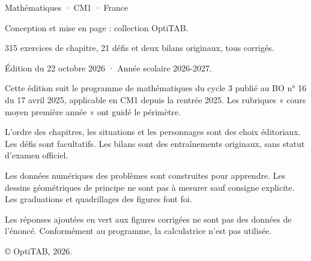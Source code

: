 \thispagestyle{empty}\vspace*{\fill}
\begin{minipage}{128mm}\fontsize{9}{13}\selectfont\color{otMuted}
{\otSemi\color{otInk}Mathématiques · CM1 · France}\par\medskip
Conception et mise en page : collection OptiTAB.\par
315 exercices de chapitre, 21 défis et deux bilans originaux, tous corrigés.\par
Édition du 22 octobre 2026 · Année scolaire 2026-2027.\par\bigskip
Cette édition suit le programme de mathématiques du cycle 3 publié au
BO n° 16 du 17 avril 2025, applicable en CM1 depuis la rentrée 2025.
Les rubriques « cours moyen première année » ont guidé le périmètre.\par\bigskip
L’ordre des chapitres, les situations et les personnages sont des choix
éditoriaux. Les défis sont facultatifs. Les bilans sont des entraînements
originaux, sans statut d’examen officiel.\par\bigskip
Les données numériques des problèmes sont construites pour apprendre.
Les dessins géométriques de principe ne sont pas à mesurer sauf consigne
explicite. Les graduations et quadrillages des figures font foi.\par\bigskip
Les réponses ajoutées en vert aux figures corrigées ne sont pas des données
de l’énoncé. Conformément au programme, la calculatrice n’est pas utilisée.\par\bigskip
© OptiTAB, 2026.\par\otSite
\end{minipage}\clearpage

